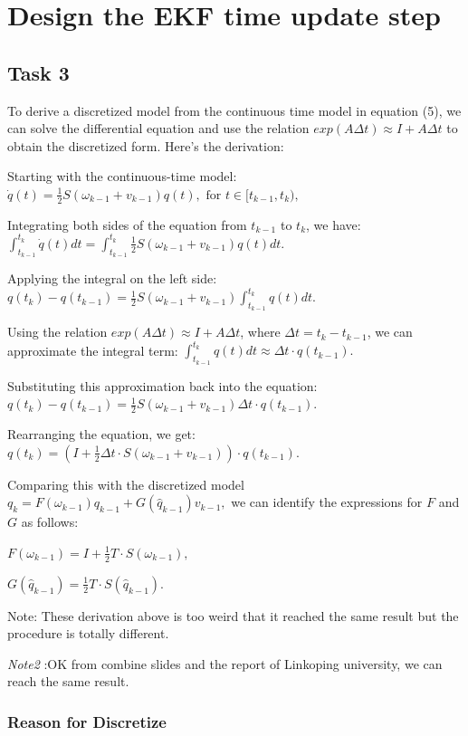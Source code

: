 \section{Design the EKF time update step}

\subsection{Task 3}

To derive a discretized model from the continuous time model in equation (5), we can solve the differential equation and use the relation $exp(AΔt) \approx I + AΔt$ to obtain the discretized form. Here's the derivation:


Starting with the continuous-time model:
$\dot{q}(t) = \frac{1}{2}S(\omega_{k-1}+v_{k-1})q(t), \text{ for } t \in [t_{k-1}, t_k),$

Integrating both sides of the equation from $t_{k-1}$ to $t_k$, we have:
$\int_{t_{k-1}}^{t_k} \dot{q}(t) dt = \int_{t_{k-1}}^{t_k} \frac{1}{2}S(\omega_{k-1}+v_{k-1})q(t) dt.$

Applying the integral on the left side:
$q(t_k) - q(t_{k-1}) = \frac{1}{2}S(\omega_{k-1}+v_{k-1})\int_{t_{k-1}}^{t_k} q(t) dt.$

Using the relation $exp(AΔt) ≈ I + AΔt$, where $Δt = t_k - t_{k-1}$, we can approximate the integral term:
$\int_{t_{k-1}}^{t_k} q(t) dt \approx \Delta t \cdot q(t_{k-1}).$

Substituting this approximation back into the equation:
$q(t_k) - q(t_{k-1}) = \frac{1}{2}S(\omega_{k-1}+v_{k-1})\Delta t \cdot q(t_{k-1}).$

Rearranging the equation, we get:
$q(t_k) = (I + \frac{1}{2}\Delta t \cdot S(\omega_{k-1}+v_{k-1})) \cdot q(t_{k-1}).$

Comparing this with the discretized model $q_k = F(\omega_{k-1})q_{k-1} + G(\hat{q}_{k-1})v_{k-1},$ we can identify the expressions for $F$ and $G$ as follows:

$F(\omega_{k-1}) = I + \frac{1}{2}T\cdot S(\omega_{k-1}),$

$G(\hat{q}_{k-1}) = \frac{1}{2}T \cdot S(\hat{q}_{k-1}).$

Note: These derivation above is too weird that it reached the same result but the procedure is totally different.

\emph{Note2} :OK from combine slides and the report of Linkoping university, we can reach the same result.


\subsubsection{Reason for Discretize}

